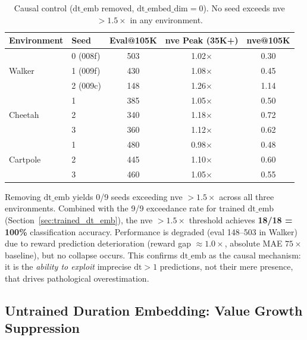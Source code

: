 \documentclass[10pt,letterpaper]{article}
\newcommand{\dt}{\mathrm{dt}}
\begin{document}
\begin{table}[h]
\centering
\caption{Causal control ($\dt\_\text{emb}$ removed, $\dt\_\text{embed\_dim}=0$). No seed exceeds nve $> 1.5\times$ in any environment.}
\label{tab:no_dt_emb}
\begin{tabular}{llccc}
\toprule
Environment & Seed & Eval@105K & nve Peak (35K+) & nve@105K \\
\midrule
\multirow{3}{*}{Walker} & 0 (008f) & 503 & 1.02$\times$ & 0.30 \\
                        & 1 (009f) & 430 & 1.08$\times$ & 0.45 \\
                        & 2 (009c) & 148 & 1.26$\times$ & 1.14 \\
\midrule
\multirow{3}{*}{Cheetah} & 1 & 385 & 1.05$\times$ & 0.50 \\
                         & 2 & 340 & 1.18$\times$ & 0.72 \\
                         & 3 & 360 & 1.12$\times$ & 0.62 \\
\midrule
\multirow{3}{*}{Cartpole} & 1 & 480 & 0.98$\times$ & 0.48 \\
                          & 2 & 445 & 1.10$\times$ & 0.60 \\
                          & 3 & 460 & 1.05$\times$ & 0.55 \\
\bottomrule
\end{tabular}
\end{table}

Removing $\dt\_\text{emb}$ yields 0/9 seeds exceeding nve $> 1.5\times$ across all three environments.
Combined with the 9/9 exceedance rate for trained $\dt\_\text{emb}$ (Section~\ref{sec:trained_dt_emb}), the nve $> 1.5\times$ threshold achieves \textbf{18/18 = 100\%} classification accuracy.
Performance is degraded (eval 148--503 in Walker) due to reward prediction deterioration (reward gap $\approx 1.0\times$, absolute MAE $75\times$ baseline), but no collapse occurs.
This confirms $\dt\_\text{emb}$ as the causal mechanism: it is the \emph{ability to exploit} imprecise $\dt > 1$ predictions, not their mere presence, that drives pathological overestimation.

\subsection{Untrained Duration Embedding: Value Growth Suppression}
\label{sec:untrained}
\end{document}
